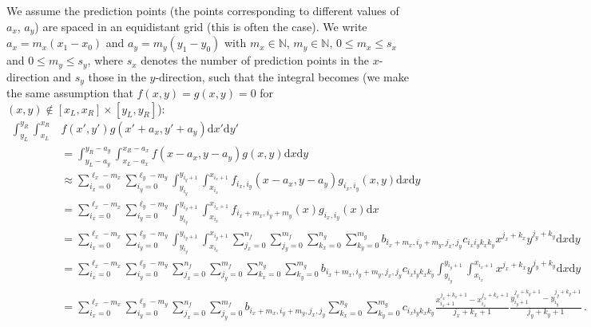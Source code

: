 We assume the prediction points (the points corresponding to different values of $a_x$, $a_y$) are spaced in an equidistant grid (this is often the case).
We write $a_x = m_x (x_1 - x_0)$ and $a_y = m_y(y_1-y_0)$ with $m_x\in \mathbb N$, $m_y \in \mathbb N$, $0\leq m_x \leq s_x$ and $0\leq m_y \leq s_y$, where $s_x$ denotes the number of prediction points in the $x$-direction and $s_y$ those in the $y$-direction, such that the integral becomes (we make the same assumption that $f(x,y)=g(x,y)=0$ for $(x,y) \notin [x_L, x_R]\times[y_L,y_R]$):
\begin{align}
    \int_{y_L}^{y_R} \int_{x_L}^{x_R} &f(x', y') g(x'+a_x, y'+a_y) \mathrm d x'\mathrm d y' \nonumber \\
    &= \int_{y_L-a_y}^{y_R-a_y} \int_{x_L-a_x}^{x_R-a_x} f(x-a_x, y-a_y) g(x, y) \mathrm d x\mathrm d y \nonumber \\
                                                &\approx \sum_{i_x=0}^{\ell_x-m_x}\sum_{i_y=0}^{\ell_y-m_y} \int_{y_{i_y}}^{y_{i_y+1}} \int_{x_{i_x}}^{x_{i_x+1}} f_{i_x, i_y}(x-a_x, y-a_y) g_{i_x, i_y}(x, y) \mathrm d x \mathrm d y \nonumber \\
                                                &= \sum_{i_x=0}^{\ell_x-m_x}\sum_{i_y=0}^{\ell_y-m_y} \int_{y_{i_y}}^{y_{i_y+1}} \int_{x_{i_x}}^{x_{i_x+1}} f_{i_x+m_x, i_y+m_y}(x) g_{i_x, i_y}(x) \mathrm d x \nonumber \\
                                                &= \sum_{i_x=0}^{\ell_x-m_x}\sum_{i_y=0}^{\ell_y-m_y} \int_{y_{i_y}}^{y_{i_y+1}} \int_{x_{i_x}}^{x_{i_y+1}} \sum_{j_x=0}^{n_f}\sum_{j_y=0}^{m_f}\sum_{k_x=0}^{n_g}\sum_{k_y=0}^{m_g} b_{i_x+m_x,i_y+m_y,j_x,j_y} c_{i_xi_yk_xk_y} x^{j_x+k_x}y^{j_y+k_y} \mathrm d x \mathrm d y \nonumber \\
                                                &= \sum_{i_x=0}^{\ell_x-m_x}\sum_{i_y=0}^{\ell_y-m_y} \sum_{j_x=0}^{n_f}\sum_{j_y=0}^{m_f}\sum_{k_x=0}^{n_g}\sum_{k_y=0}^{m_g} b_{i_x+m_x,i_y+m_y,j_x,j_y} c_{i_xi_yk_xk_y}  \int_{y_{i_y}}^{y_{i_y+1}} \int_{x_{i_x}}^{x_{i_x+1}}  x^{j_x+k_x}y^{j_y+k_y} \mathrm d x \mathrm d y \nonumber \\
                                                &= \sum_{i_x=0}^{\ell_x-m_x}\sum_{i_y=0}^{\ell_y-m_y} \sum_{j_x=0}^{n_f}\sum_{j_y=0}^{m_f} b_{i_x+m_x,i_y+m_y,j_x,j_y} \sum_{k_x=0}^{n_g}\sum_{k_y=0}^{m_g} c_{i_xi_yk_xk_y} \frac{x_{i_x+1}^{j_x+k_x+1} - x_{i_x}^{j_x+k_x+1}}{j_x+k_x+1}  \frac{y_{i_y+1}^{j_y+k_y+1} - y_{i_y}^{j_y+k_y+1}}{j_y+k_y+1} \,.\nonumber
\end{align}
